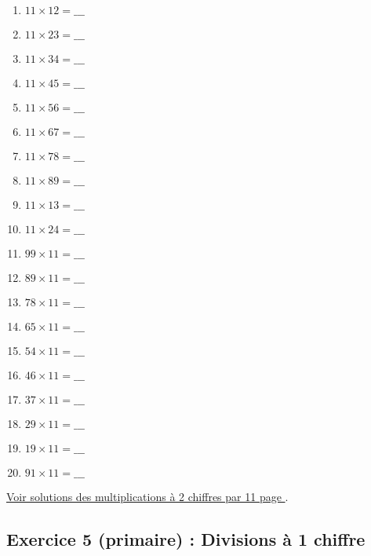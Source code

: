\begin{enumerate}[label=C\arabic*)]
    \item \(11\times 12 = \_\_\_\)
    \item \(11\times 23 = \_\_\_\)
    \item \(11\times 34 = \_\_\_\)
    \item \(11\times 45 = \_\_\_\)
    \item \(11\times 56 = \_\_\_\)
    \item \(11\times 67 = \_\_\_\)
    \item \(11\times 78 = \_\_\_\)
    \item \(11\times 89 = \_\_\_\)
    \item \(11\times 13 = \_\_\_\)
    \item \(11\times 24 = \_\_\_\)
    \item \(99\times 11 = \_\_\_\)
    \item \(89\times 11 = \_\_\_\)
    \item \(78\times 11 = \_\_\_\)
    \item \(65\times 11 = \_\_\_\)
    \item \(54\times 11 = \_\_\_\)
    \item \(46\times 11 = \_\_\_\)
    \item \(37\times 11 = \_\_\_\)
    \item \(29\times 11 = \_\_\_\)
    \item \(19\times 11 = \_\_\_\)
    \item \(91\times 11 = \_\_\_\)
\end{enumerate}

\hyperref[sol:niveau4]{Voir solutions des multiplications à 2 chiffres par 11 page \pageref{sol:niveau4}}.

\newpage


\subsection{Exercice 5 (primaire) : Divisions à 1 chiffre}


\label{calc:niveau5}

